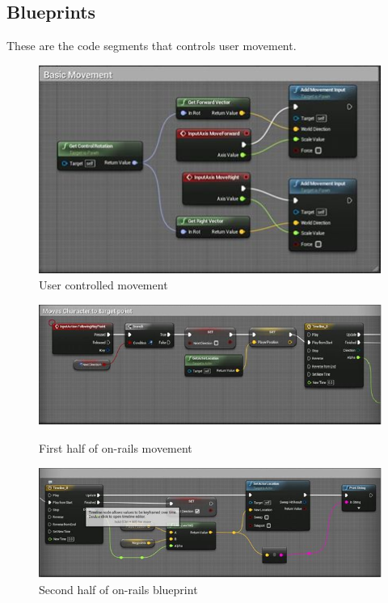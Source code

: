 \subsection{Blueprints}
These are the code segments that controls user movement.

\begin{figure}
\centering
\includegraphics[scale=1.0]{Blueprints/basicMovement.png}
\caption{User controlled movement}
\end{figure}

\begin{figure}
\centering
\begin{minipage}{0.45\textwidth}
\centering
\includegraphics[scale=0.5]{Blueprints/moveToPoint.png}
\caption{First half of on-rails movement}
\end{minipage}\hfill
\begin{minipage}{0.45\textwidth}
\centering
\includegraphics[scale=0.5]{Blueprints/moveToPoint2.png}
\caption{Second half of on-rails blueprint}
\end{minipage}
\end{figure}



